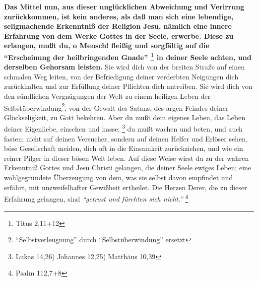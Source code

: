 \textbf{Das Mittel nun, aus dieser unglücklichen Abweichung und Verirrung zurückkommen,
ist kein anderes, als daß man sich eine lebendige, seligmachende Erkenntniß der
Religion Jesu, nämlich eine innere Erfahrung von dem Werke Gottes in der Seele,
erwerbe. Diese zu erlangen, mußt du, o Mensch! fleißig und sorgfältig auf die 
"`Erscheinung der heilbringenden Gnade"'
\footnote{Titus 2,11+12}
in deiner Seele
achten, und derselben Gehorsam leisten.} Sie wird dich von der breiten Straße auf
einen schmalen Weg leiten, von der Befriedigung deiner verderbten Neigungen dich
zurückhalten und zur Erfüllung deiner Pflichten dich antreiben. Sie wird dich
von den sündlichen Vergnügungen der Welt zu einem heiligen Leben der
Selbstüberwindung\footnote{"`Selbstverleugnung"' durch "`Selbstüberwindung"' ersetzt}, von der Gewalt des Satans, des argen Feindes deiner
Glückseligkeit, zu Gott bekehren. Aber du mußt dein eigenes Leben, das Leben
deiner Eigenliebe, einsehen und hasse;
\footnote{Lukas 14,26) Johannes 12,25) Matthäus 10,39}
du mußt wachen und beten, und auch fasten; nicht auf deinen Versucher,
sondern auf deinen Helfer und Erlöser sehen, böse Gesellschaft meiden, dich oft
in die Einsamkeit zurückziehen, und wie ein reiner Pilger\index{} in dieser bösen Welt
leben. Auf diese Weise wirst du zu der wahren Erkenntniß Gottes und Jesu Christi
gelangen, die deiner Seele ewiges Leben; eine wohlgegründete Überzeugung von
dem, was sie selbst davon empfindet und erfährt, mit unzweifelhafter Gewißheit
ertheilet. Die Herzen Derer, die zu dieser Erfahrung gelangen, sind
\textit{"`getrost und fürchten sich nicht."'}
\footnote{Psalm 112,7+8}
